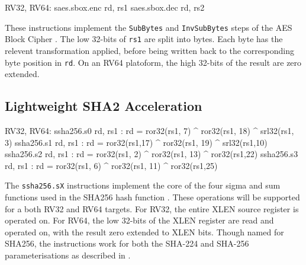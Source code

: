 \begin{isa}
RV32, RV64:
    saes.sbox.enc rd, rs1
    saes.sbox.dec rd, rs2
\end{isa}

These instructions implement the 
{\tt SubBytes} \cite[Section 5.1.1]{nist:fips:197}
and
{\tt InvSubBytes} \cite[Section 5.3.1]{nist:fips:197}
steps of the AES Block Cipher \cite{nist:fips:197}.
The low 32-bits of {\tt rs1} are split into bytes.
Each byte has the relevent transformation applied, before
being written back to the corresponding byte position in {\tt rd}.
On an RV64 platoform, the high 32-bits of the result are zero
extended.





\subsection{Lightweight SHA2 Acceleration}

\begin{isa}
RV32, RV64:
    ssha256.s0 rd, rs1 : rd = ror32(rs1, 7) ^ ror32(rs1, 18) ^ srl32(rs1, 3)
    ssha256.s1 rd, rs1 : rd = ror32(rs1,17) ^ ror32(rs1, 19) ^ srl32(rs1,10)
    ssha256.s2 rd, rs1 : rd = ror32(rs1, 2) ^ ror32(rs1, 13) ^ ror32(rs1,22)
    ssha256.s3 rd, rs1 : rd = ror32(rs1, 6) ^ ror32(rs1, 11) ^ ror32(rs1,25)
\end{isa}

The {\tt ssha256.sX}
instructions implement the core of the four sigma and sum functions used in
the SHA256 hash function \cite[Section 4.1.2]{nist:fips:180:4}.
These operations will be supported for a both RV32 and RV64 targets.
For RV32, the entire XLEN source register is operated on.
For RV64, the low 32-bits of the XLEN register are read and operated on,
with the result zero extended to XLEN bits.
Though named for SHA256, the instructions work for both the
SHA-224 and SHA-256 parameterisations as described in
\cite{nist:fips:180:4}.


